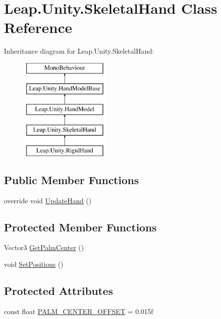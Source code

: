 \hypertarget{class_leap_1_1_unity_1_1_skeletal_hand}{}\section{Leap.\+Unity.\+Skeletal\+Hand Class Reference}
\label{class_leap_1_1_unity_1_1_skeletal_hand}
Inheritance diagram for Leap.\+Unity.\+Skeletal\+Hand\+:\begin{figure}[H]
\begin{center}
\leavevmode
\includegraphics[height=5.000000cm]{class_leap_1_1_unity_1_1_skeletal_hand}
\end{center}
\end{figure}
\subsection*{Public Member Functions}
\begin{DoxyCompactItemize}
\item 
override void \mbox{\hyperlink{class_leap_1_1_unity_1_1_skeletal_hand_afe381218670f759392ccbb420dae78f4}{Update\+Hand}} ()
\end{DoxyCompactItemize}
\subsection*{Protected Member Functions}
\begin{DoxyCompactItemize}
\item 
Vector3 \mbox{\hyperlink{class_leap_1_1_unity_1_1_skeletal_hand_aa499e691e131221612553967bbd9cc93}{Get\+Palm\+Center}} ()
\item 
void \mbox{\hyperlink{class_leap_1_1_unity_1_1_skeletal_hand_a65cd240a6967b624cf928043a07c257d}{Set\+Positions}} ()
\end{DoxyCompactItemize}
\subsection*{Protected Attributes}
\begin{DoxyCompactItemize}
\item 
const float \mbox{\hyperlink{class_leap_1_1_unity_1_1_skeletal_hand_a6fd0e37776aa6c1f28c0db3c63de6d10}{P\+A\+L\+M\+\_\+\+C\+E\+N\+T\+E\+R\+\_\+\+O\+F\+F\+S\+ET}} = 0.\+015f
\end{DoxyCompactItemize}
